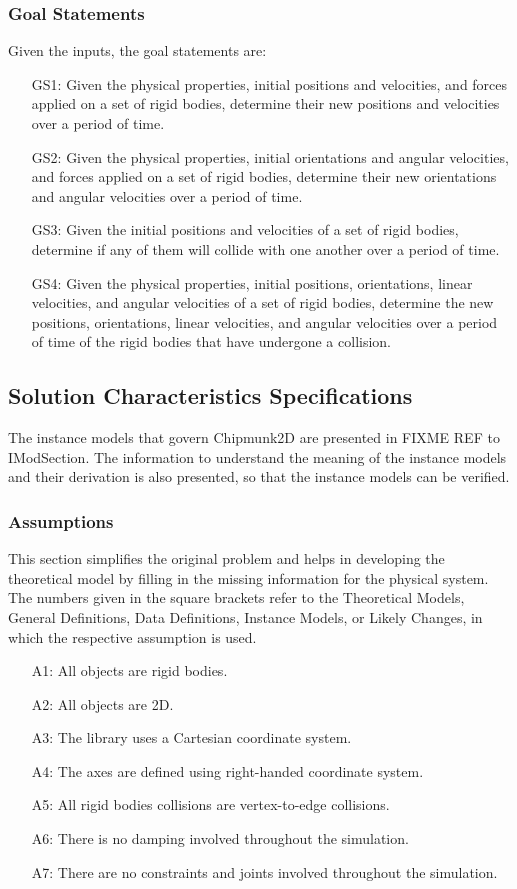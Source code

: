 \documentclass[12pt]{article}
\begin{document}
\subsubsection{Goal Statements}
\label{Sec:GoalStat}
Given the inputs, the goal statements are:
\begin{itemize}
\item[GS1:]Given the physical properties, initial positions and velocities, and forces applied on a set of rigid bodies, determine their new positions and velocities over a period of time.
\item[GS2:]Given the physical properties, initial orientations and angular velocities, and forces applied on a set of rigid bodies, determine their new orientations and angular velocities over a period of time.
\item[GS3:]Given the initial positions and velocities of a set of rigid bodies, determine if any of them will collide with one another over a period of time.
\item[GS4:]Given the physical properties, initial positions, orientations, linear velocities, and angular velocities of a set of rigid bodies, determine the new positions, orientations, linear velocities, and angular velocities over a period of time of the rigid bodies that have undergone a collision.
\end{itemize}
\subsection{Solution Characteristics Specifications}
\label{Sec:SoluCharSpec}
The instance models that govern Chipmunk2D are presented in FIXME REF to IModSection. The information to understand the meaning of the instance models and their derivation is also presented, so that the instance models can be verified.
\subsubsection{Assumptions}
\label{Sec:Assu}
This section simplifies the original problem and helps in developing the theoretical model by filling in the missing information for the physical system. The numbers given in the square brackets refer to the Theoretical Models, General Definitions, Data Definitions, Instance Models, or Likely Changes, in which the respective assumption is used.
\begin{itemize}
\item[A1:]All objects are rigid bodies.
\item[A2:]All objects are 2D.
\item[A3:]The library uses a Cartesian coordinate system.
\item[A4:]The axes are defined using right-handed coordinate system.
\item[A5:]All rigid bodies collisions are vertex-to-edge collisions.
\item[A6:]There is no damping involved throughout the simulation.
\item[A7:]There are no constraints and joints involved throughout the simulation.
\end{itemize}
\end{document}

